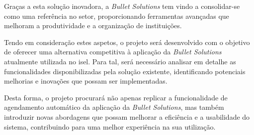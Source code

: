 Graças a esta solução inovadora, a \textit{Bullet Solutions} tem vindo a consolidar-se como uma referência no setor, proporcionando ferramentas avançadas que melhoram a produtividade e a organização de instituições.

Tendo em consideração estes aspetos, o projeto será desenvolvido com o objetivo de oferecer uma alternativa competitiva à aplicação da \textit{Bullet Solutions} atualmente utilizada no \gls{isel}. Para tal, será necessário analisar em detalhe as funcionalidades disponibilizadas pela solução existente, identificando potenciais melhorias e inovações que possam ser implementadas.

Desta forma, o projeto procurará não apenas replicar a funcionalidade de agendamento automático da aplicação da \textit{Bullet Solutions}, mas também introduzir novas abordagens que possam melhorar a eficiência e a usabilidade do sistema, contribuindo para uma melhor experiência na sua utilização.